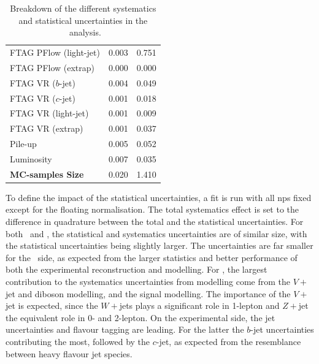 \begin{table}[h!]
\begin{tabular}{l  C{2cm} C{2cm}}
        FTAG PFlow (light-jet)         &  0.003 & 0.751 \\
        FTAG PFlow (extrap)          &  0.000 & 0.000 \\
        FTAG VR ($b$-jet)            &  0.004 & 0.049 \\
        FTAG VR ($c$-jet)            &  0.001 & 0.018 \\
        FTAG VR (light-jet)            &  0.001 & 0.009 \\
        FTAG VR (extrap)             &  0.001 & 0.037 \\
        Pile-up                      &  0.005 & 0.052 \\
        Luminosity                   &  0.007 & 0.035 \\
        \hline
        \textbf{MC-samples Size}     &  0.020 & 1.410 \\
        \hline \hline
    \end{tabular}
    \caption{Breakdown of the different systematics and statistical uncertainties in the \vhbc\ analysis.}
    \label{tab:exp-breakdown}
\end{table}

To define the impact of the statistical uncertainties, a fit is run with all \gls{np}s fixed except for the floating normalisation. The total systematics effect is set to the difference in quadrature between the total and the statistical uncertainties. For both \vhb\ and \vhc, the statistical and systematics uncertainties are of similar size, with the statistical uncertainties being slightly larger. The uncertainties are far smaller for the \vhb\ side, as expected from the larger statistics and better performance of both the experimental reconstruction and modelling. For \vhb, the largest contribution to the systematics uncertainties from modelling come from the $V+$jet and diboson modelling, and the signal modelling. The importance of the $V+$jet is expected, since the $W+$jets plays a significant role in 1-lepton and $Z+$jet the equivalent role in 0- and 2-lepton. On the experimental side, the jet uncertainties and flavour tagging are leading. For the latter the $b$-jet uncertainties contributing the most, followed by the $c$-jet, as expected from the resemblance between heavy flavour jet species. \\

